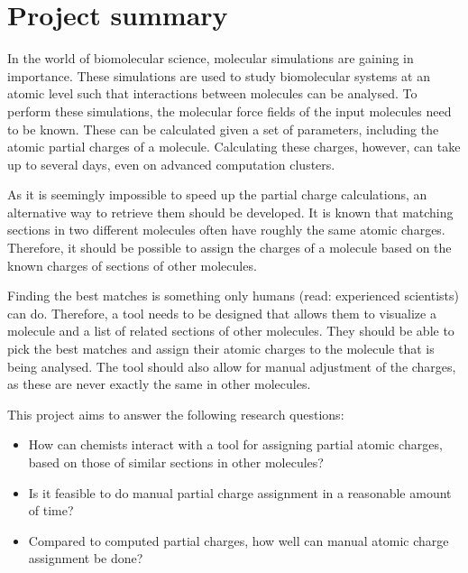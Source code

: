 \chapter{Project summary}

In the world of biomolecular science, molecular simulations are gaining in importance. These simulations are used to study biomolecular systems at an atomic level such that interactions between molecules can be analysed. To perform these simulations, the molecular force fields of the input molecules need to be known. These can be calculated given a set of parameters, including the atomic partial charges of a molecule. Calculating these charges, however, can take up to several days, even on advanced computation clusters.

As it is seemingly impossible to speed up the partial charge calculations, an alternative way to retrieve them should be developed. It is known that matching sections in two different molecules often have roughly the same atomic charges. Therefore, it should be possible to assign the charges of a molecule based on the known charges of sections of other molecules.

Finding the best matches is something only humans (read: experienced scientists) can do. Therefore, a tool needs to be designed that allows them to visualize a molecule and a list of related sections of other molecules. They should be able to pick the best matches and assign their atomic charges to the molecule that is being analysed. The tool should also allow for manual adjustment of the charges, as these are never exactly the same in other molecules.

This project aims to answer the following research questions:
\begin{itemize}
\item How can chemists interact with a tool for assigning partial atomic charges, based on those of similar sections in other molecules?
\item Is it feasible to do manual partial charge assignment in a reasonable amount of time?
\item Compared to computed partial charges, how well can manual atomic charge assignment be done?
\end{itemize}
